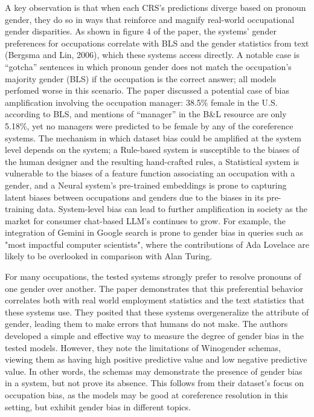 \documentclass[11pt]{article}
\begin{document}
A key observation is that when each CRS's predictions diverge based
on pronoun gender, they do so in ways that reinforce and magnify real-world 
occupational gender disparities. As shown in figure 4 of the paper, the systems' gender
preferences for occupations correlate with BLS
and the gender statistics from text (Bergsma and Lin, 2006), which these systems access directly. 
A notable case is “gotcha” sentences in which pronoun gender does not match the occupation's 
majority gender (BLS) if the occupation is the correct answer; all models perfomed worse in this scenario. 
The paper discussed a potential case of bias amplification involving the occupation manager: 
38.5\% female in the U.S. according to BLS, and mentions of
“manager” in the B\&L resource are only 5.18\%, yet no managers 
were predicted to be female by any of the coreference systems.
The mechanism in which dataset bias could be amplified at the system level depends on the system;
a Rule-based system is susceptible to the biases of the human designer and the resulting hand-crafted rules,
a Statistical system is vulnerable to the biases of a feature function associating an occupation with a gender,
and a Neural system's pre-trained embeddings is prone to capturing latent biases between occupations and genders
due to the biases in its pre-training data. System-level bias can
lead to further amplification in society as the market for consumer chat-based LLM's continues to grow. For example,
the integration of Gemini in Google search is prone to gender bias in queries such as "most impactful computer scientists", 
where the contributions of Ada Lovelace are likely to be overlooked in comparison with Alan Turing.

For many occupations, the tested systems strongly prefer to resolve pronouns
of one gender over another. The paper demonstrates that
this preferential behavior correlates both with real world employment statistics and the text statistics
that these systems use.  They posited that these systems overgeneralize the attribute of gender, 
leading them to make errors that humans do not make. The authors developed a simple and effective way to 
measure the degree of gender bias in the tested models. However, they note the limitations of
Winogender schemas, viewing them as having high positive predictive value and low negative predictive
value. In other words, the schemas may demonstrate the presence
of gender bias in a system, but not prove its absence. This follows from their dataset's focus on occupation
bias, as the models may be good at coreference resolution in this setting, but exhibit gender
bias in different topics.
\end{document}
